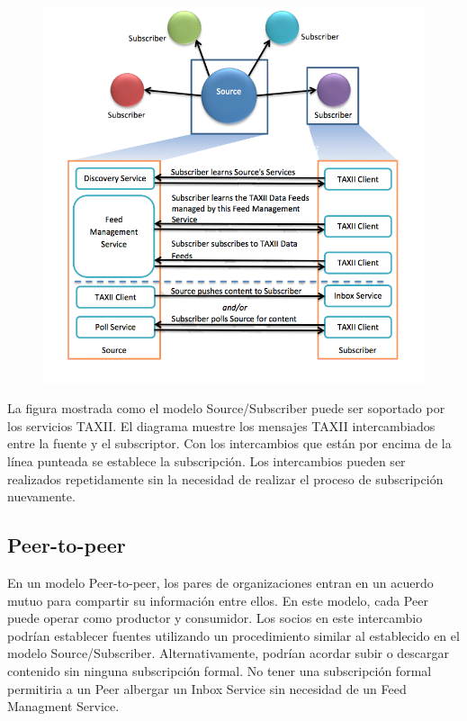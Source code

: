 \begin{figure}[ht!]
  \centering
    \includegraphics[width=150mm]{./Figures/SourceSuscriberModel.png}
\end{figure}

La figura mostrada como el modelo Source/Subscriber puede ser soportado por los 
servicios TAXII. El diagrama muestre los mensajes TAXII intercambiados entre la
fuente y el subscriptor. Con los intercambios que están por encima de la línea 
punteada se establece la subscripción. Los intercambios pueden ser realizados 
repetidamente sin la necesidad de realizar el proceso de subscripción 
nuevamente.

\subsection{Peer-to-peer}

En un modelo Peer-to-peer, los pares de organizaciones entran en un acuerdo 
mutuo para compartir su información entre ellos. En este modelo, cada Peer puede 
operar como productor y consumidor. Los socios en este intercambio podrían 
establecer fuentes utilizando un procedimiento similar al establecido en el 
modelo Source/Subscriber. Alternativamente, podrían acordar subir o descargar 
contenido sin ninguna subscripción formal. No tener una subscripción formal 
permitiria a un Peer albergar un Inbox Service sin necesidad de un Feed 
Managment Service.

